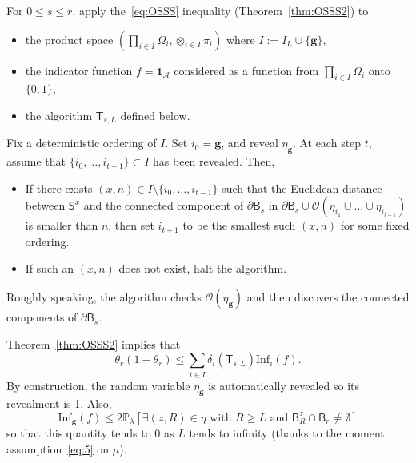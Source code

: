 \documentclass[AHL,Unicode,longabstracts]{cedram}
\newcommand{\infl}{\mathrm{Inf}}
\newcommand{\gbf}{\mathbf{g}}
\begin{document}
For $0\le s\le r$, apply the~\eqref{eq:OSSS} inequality (Theorem~\ref{thm:OSSS2}) to
\begin{itemize}%
\item the product space $(\prod_{i\in I}\Omega_i,\otimes_{i\in I}\pi_i)$ where $I:=I_L\cup\{{\gbf}\}$,
\item the indicator function $f=\mathbf 1_{\mathcal A}$ considered as a function from $\prod_{i\in I}\Omega_i$ onto $\{0,1\}$,
\item the algorithm $\mathsf T_{s,L}$ defined below.
\end{itemize}
\begin{defi}
Fix a deterministic ordering of $I$. Set $i_0 = {\gbf}$, and reveal $\eta_{\gbf}$. At each step $t$, assume that $\{i_0,\dots,i_{t-1}\} \subset I$ has been revealed. Then,
\begin{itemize}
\item If there exists $(x,n) \in I\setminus \{i_0,\dots,i_{t-1}\}$ such that the Euclidean distance between $\mathsf S^x$ and the connected component of $\partial\mathsf B_s$ in $\partial\mathsf B_s\cup{\mathcal O}(\eta_{i_1}\cup\dots\cup\eta_{i_{t-1}})$ is smaller than $n$, then set $i_{t+1}$ to be the smallest such $(x,n)$ for some fixed ordering.
\item If such an $(x,n)$ does not exist, halt the algorithm.
\end{itemize}
\end{defi}

\begin{rema}
Roughly speaking, the algorithm checks ${\mathcal O}(\eta_{\gbf})$ and then discovers the connected components of $\partial\mathsf B_s$.
\end{rema}

Theorem~\ref{thm:OSSS2} implies that
\begin{equation}\label{eq:OSSSa}
\theta_{r}(1-\theta_{r}) \leq \sum_{i\in I} \delta_{i}(\mathsf T_{s,L}) \infl_i(f).
\end{equation}
By construction, the random variable $\eta_{\gbf}$ is automatically revealed so its revealment is 1. Also,
\begin{equation}\label{eq:r1}
\infl_{\gbf}(f)\le 2{\mathbb P}_\lambda[\exists (z,R)\in\eta \text{ with } R\ge L \text{ and }\mathsf B_R^z\cap \mathsf B_r\ne \emptyset]
\end{equation}
so that this quantity tends to 0 as $L$ tends to infinity (thanks to the moment assumption~\eqref{eq:5} on $\mu$).
\end{document}
